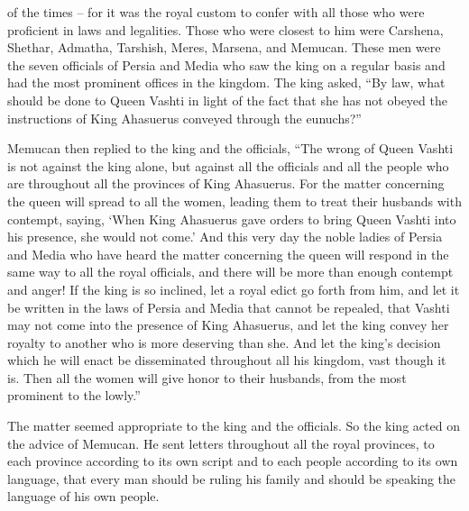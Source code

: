 {of the times
– for
it was the royal
custom
to confer
with all
those who were proficient
in laws
and legalities.
Those who were closest
to
him were Carshena,
Shethar,
Admatha,
Tarshish,
Meres,
Marsena,
and Memucan.
These men were the seven
officials
of Persia
and Media
who saw
the king
on a regular basis
and had the most prominent
offices
in the kingdom.
The king asked, “By law,
what
should be done
to Queen
Vashti
in light of the fact that
she has not
obeyed the instructions
of King
Ahasuerus
conveyed through
the eunuchs?”
\par }{\PP {}Memucan
then replied
to the king
and the officials,
“The wrong
of Queen
Vashti
is not
against
the king
alone,
but
against
all
the officials
and all
the people
who
are throughout all
the provinces
of King
Ahasuerus.
For
the matter
concerning the queen
will spread
to all
the women,
leading them to treat
their husbands
with contempt,
saying,
‘When King
Ahasuerus
gave orders
to bring
Queen
Vashti
into his presence,
she would not
come.’
And this
very day
the noble ladies
of Persia
and Media
who
have heard
the
matter
concerning the queen
will respond in the same way to all
the royal
officials,
and there will be more than enough
contempt
and anger!
If
the king
is so inclined,
let a royal
edict
go forth
from him,
and let it be written
in the laws
of Persia
and Media
that cannot
be repealed,
that
Vashti
may not
come
into the presence
of King
Ahasuerus,
and let the king
convey
her royalty
to another
who is more deserving
than she.
And let the king’s
decision
which
he
will enact
be disseminated throughout all
his kingdom,
vast
though
it is. Then all
the women
will give
honor
to
their husbands,
from the most prominent
to the lowly.”
\par }{\PP {}The matter
seemed
appropriate
to the king
and the officials.
So
the king
acted
on the advice
of Memucan.
He sent
letters
throughout
all
the royal
provinces,
to
each
province
according to its own script
and to
each
people
according to its own language,
that every
man
should be
ruling
his family
and should be speaking
the language
of his own people.

}
